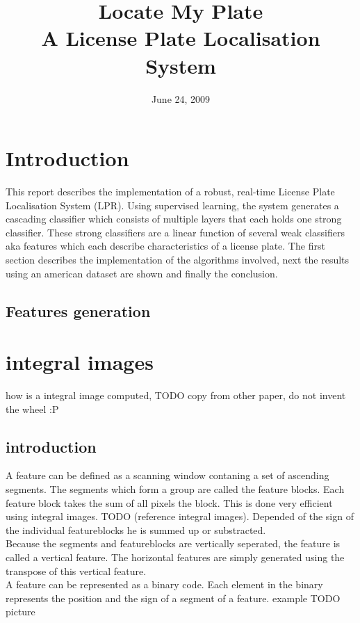 \documentclass[a4paper,11pt]{article}
\title{Locate My Plate \\ A License Plate Localisation System}
\date{June 24, 2009}
\begin{document}
\maketitle
\section*{Introduction}
This report describes the implementation of a robust, real-time License Plate
Localisation System (LPR). Using supervised learning, the system generates a
cascading classifier which consists of multiple layers that each holds one
strong classifier. These strong classifiers are a linear function of several
weak classifiers aka features which each describe characteristics of a license
plate. The first section describes the implementation of the algorithms
involved, next the results using an american dataset are shown and finally the
conclusion. \cite{viola}


\subsection{Features generation}
\section*{integral images}
how is a integral image computed, TODO copy from other paper, do not invent the
wheel :P

	\subsection{introduction}
	A feature can be defined as a scanning window contaning a set of ascending
	segments. The segments which form a group are called the feature blocks. Each
	feature block takes the sum of all pixels the block. This is done very
	efficient using integral images.  TODO (reference integral images). Depended
	of the sign of the individual featureblocks he is summed up or substracted.\\ 

	Because the segments and featureblocks are vertically seperated, the
	feature is called a vertical feature.  The horizontal features are simply
	generated using the transpose of this vertical feature.\\

	A feature can be represented as a binary code. Each element in the binary
	represents the position and the sign of a segment of a feature.
	example TODO picture\\
\end{document}
